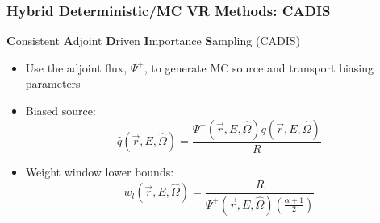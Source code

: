 \documentclass{beamer}
\begin{document}

\begin{frame}
	\frametitle{Hybrid Deterministic/MC VR Methods: CADIS \cite{cadis}}
	\begin{block}{\textbf{C}onsistent \textbf{A}djoint \textbf{D}riven
	\textbf{I}mportance \textbf{S}ampling (CADIS)}
  \begin{itemize}
  \item{Use the adjoint flux, $\Psi^+$, to generate MC source and transport biasing
	  parameters}
  \item{Biased source:}
\begin{equation} \label{eq:3.8}
	\widehat{q}(\overrightarrow{r}, E, \widehat{\Omega}) =
	\frac{\Psi^{+}(\overrightarrow{r}, E,\widehat{\Omega})
	q(\overrightarrow{r}, E, \widehat{\Omega})}{R}
\end{equation}

  \item{Weight window lower bounds:}
\begin{equation} \label{eq:3.12}
	w_{l}(\overrightarrow{r}, E, \widehat{\Omega}) = 
	\frac{R}{\Psi^{+}(\overrightarrow{r}, E, \widehat{\Omega})
	(\frac{\alpha + 1}{2})}
\end{equation}
  \end{itemize}
\end{block}
\end{frame}
\end{document}
